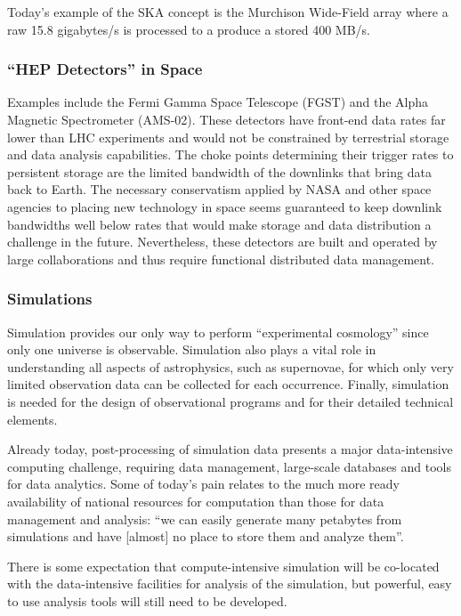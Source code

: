 Today's example of the SKA concept is the Murchison Wide-Field array where a raw 
15.8 gigabytes/s is processed to a produce a stored 400 MB/s.

\subsubsection{“HEP Detectors” in Space}
Examples include the Fermi Gamma Space Telescope (FGST) and the Alpha Magnetic 
Spectrometer (AMS-02).  These detectors have front-end data rates far lower than 
LHC experiments and would not be constrained by terrestrial storage and data analysis 
capabilities.  The choke points determining their trigger rates to persistent storage 
are the limited bandwidth of the downlinks that bring data back to Earth.  The 
necessary conservatism applied by NASA and other space agencies to placing new 
technology in space seems guaranteed to keep downlink bandwidths well below rates 
that would make storage and data distribution a challenge in the future.  
Nevertheless, these detectors are built and operated by large collaborations and 
thus require functional distributed data management.

\subsubsection{Simulations}
Simulation provides our only way to perform ``experimental cosmology'' since only one 
universe is observable.  Simulation also plays a vital role in understanding all 
aspects of astrophysics, such as supernovae, for which only very limited observation 
data can be collected for each occurrence. Finally, simulation is needed for the 
design of observational programs and for their detailed technical elements.

Already today, post-processing of simulation data presents a major data-intensive 
computing challenge, requiring data management, large-scale databases and tools for 
data analytics.  Some of today's pain relates to the much more ready availability of 
national resources for computation than those for data management and analysis: ``we 
can easily generate many petabytes from simulations and have [almost] no place to 
store them and analyze them''.

There is some expectation that compute-intensive simulation will be co-located with the 
data-intensive facilities for analysis of the simulation, but powerful, easy to use 
analysis tools will still need to be developed.

